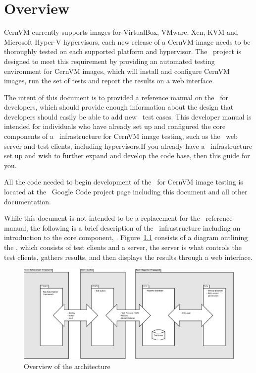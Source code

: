\chapter{Overview}
\label{sct:overview}

CernVM currently supports images for VirtualBox, VMware, Xen, KVM and Microsoft Hyper-V hypervisors, each new release of a CernVM image needs to be 
thoroughly tested on each supported platform and hypervisor. The \cernvmreleasetesting\ project is designed to meet this requirement by providing an 
automated testing environment for CernVM images, which will install and configure CernVM images, run the set of tests and report the results on a web
interface.

The intent of this document is to provided a reference manual on the \cernvmtestframework\ for developers, which should provide enough information 
about the design that developers should easily be able to add new \cernvmreleasetesting\ test cases. This developer manual is intended for individuals
who have already set up and configured the core components of a \releasetesting\ infrastructure for CernVM image testing, such as the \amdtapper\
web server and test clients, including hypervisors.If you already have a \cernvmreleasetesting\ infrastructure set up and wish to further expand
and develop the code base, then this guide for you.

All the code needed to begin development of the \cernvmtestframework\ for CernVM image testing is located at the \cernvmreleasetesting\ Google 
Code project page\cite{GCreleasetesting} including this document and all other documentation. 

While this document is not intended to be a replacement for the \amdtapper\ reference manual, the following is a brief description of the
\releasetesting\ infrastructure including an introduction to the core component, \amdtapper\cite{tapper}. Figure~\ref{fig:architecture} 
consists of a diagram outlining the \indexed{\tapper~Architecture}, which consists of test clients and a server, the server is what 
controls the test clients, gathers results, and then displays the results through a web interface.

\begin{figure}[hbp]
	\begin{center}
		\includegraphics[scale=0.25]{img/tapper_architecture_overview.png}
	\end{center}
	\caption{Overview of the \tapper architecture}
	\label{fig:architecture}
\end{figure}


